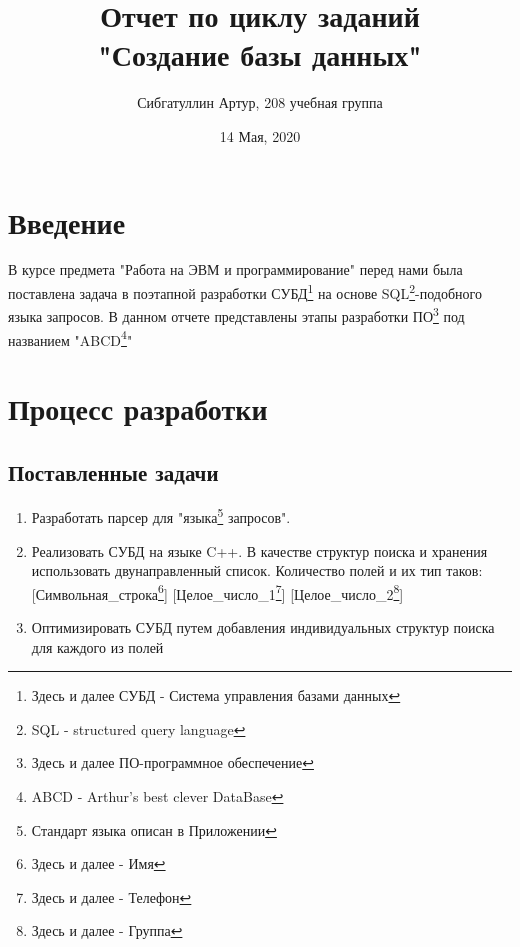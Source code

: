 \documentclass[a4paper, 14pt]{extreport}
\title{\textbf{Отчет по циклу заданий \\"Создание базы данных"}}
\author{Сибгатуллин Артур, 208 учебная группа}
\date{14 Мая, 2020}
\begin{document}
	\maketitle
	\tableofcontents
	\pagebreak
	
	\section{Введение}
	 В курсе предмета "Работа на ЭВМ и программирование" перед нами была поставлена задача в поэтапной разработки СУБД\footnote{Здесь и далее СУБД - Система управления базами данных } на основе SQL\footnote{SQL - structured query language}-подобного языка запросов. В данном отчете представлены этапы разработки ПО\footnote{Здесь и далее ПО-программное обеспечение} под названием "ABCD\footnote{ABCD - Arthur's best clever DataBase}"
	 
	 \newpage
	 \section{Процесс разработки}
	 
	 \subsection{Поставленные задачи}
	 	\begin{enumerate}
	 		\item Разработать парсер для "языка\footnote{Стандарт языка описан в Приложении} запросов".
	 		\item Реализовать СУБД на языке C++. В качестве структур поиска и хранения использовать двунаправленный список. Количество полей и их тип таков: [Символьная\_строка\footnote{Здесь и далее - Имя}] [Целое\_число\_1\footnote{Здесь и далее - Телефон}] [Целое\_число\_2\footnote{Здесь и далее - Группа}] 
	 		\item Оптимизировать СУБД путем добавления индивидуальных структур поиска для каждого из полей\
 		\end{enumerate}
 	
\end{document}
